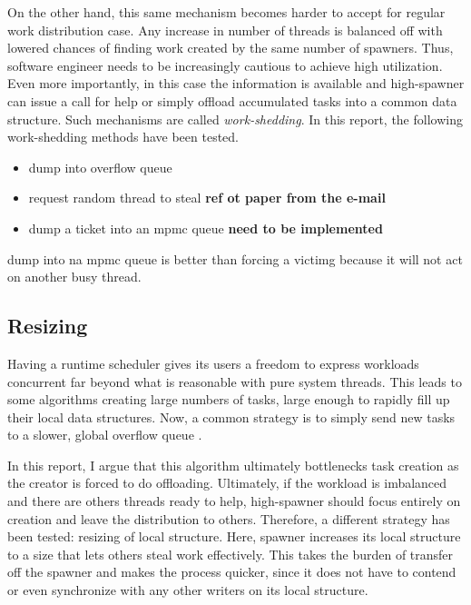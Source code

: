 \documentclass[12pt,a4paper,twoside]{report}
\begin{document}
On the other hand, this same mechanism becomes harder to accept for regular work distribution case. Any increase in number of threads is balanced off with lowered chances of finding work created by the same number of spawners. Thus, software engineer needs to be increasingly cautious to achieve high utilization. Even more importantly, in this case the information is available and high-spawner can issue a call for help or simply offload accumulated tasks into a common data structure. Such mechanisms are called \textit{work-shedding}. In this report, the following work-shedding methods have been tested. 

\begin{itemize}
    \item dump into overflow queue 
    \item request random thread to steal \textbf{ref ot paper from the e-mail}
    \item dump a ticket into an mpmc queue \textbf{need to be implemented}
\end{itemize}

dump into na mpmc queue is better than forcing a victimg because it will not act on another busy thread. 




\subsection{Resizing}
\label{section:resizing}
Having a runtime scheduler gives its users a freedom to express workloads concurrent far beyond what is reasonable with pure system threads. This leads to some algorithms creating large numbers of tasks, large enough to rapidly fill up their local data structures. Now, a common strategy is to simply send new tasks to a slower, global overflow queue .

In this report, I argue that this algorithm ultimately bottlenecks task creation as the creator is forced to do offloading. Ultimately, if the workload is imbalanced and there are others threads ready to help, high-spawner should focus entirely on creation and leave the distribution to others. Therefore, a different strategy has been tested: resizing of local structure. Here, spawner increases its local structure to a size that lets others steal work effectively. This takes the burden of transfer off the spawner and makes the process quicker, since it does not have to contend or even synchronize with any other writers on its local structure. 
\end{document}
